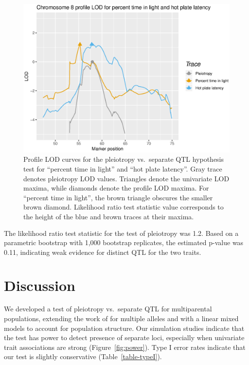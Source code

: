 \documentclass[12pt,twoside, lineno]{gsajnl}
\begin{document}
\begin{figure}
\includegraphics[width = \textwidth]{../Rmd/profile.eps}
\caption{Profile LOD curves for the pleiotropy vs.\ separate QTL
  hypothesis test for ``percent time in light'' and ``hot plate latency''.
  Gray trace denotes pleiotropy LOD values. Triangles denote the
  univariate LOD maxima, while diamonds denote the profile LOD maxima.
  For ``percent time in light'', the brown triangle obscures the
  smaller brown diamond. Likelihood ratio test statistic value
  corresponds to the height of the blue and brown traces at their
  maxima.}
\label{fig:profiles}
\end{figure}

The likelihood ratio test statistic for the test of pleiotropy was
1.2. Based on a parametric bootstrap with 1,000 bootstrap replicates,
the estimated p-value was 0.11, indicating weak
evidence for distinct QTL for the two traits.









\section{Discussion}

We developed a test of pleiotropy vs.\ separate QTL for multiparental
populations, extending the work of \citet{jiang1995multiple} for
multiple alleles and with a linear mixed models to account for
population structure. Our simulation
studies indicate that the test has power to detect presence of
separate loci, especially when univariate trait associations are
strong (Figure~\ref{fig:power}). Type I error rates indicate that our
test is slightly conservative (Table~\ref{table-typeI}).
\end{document}

